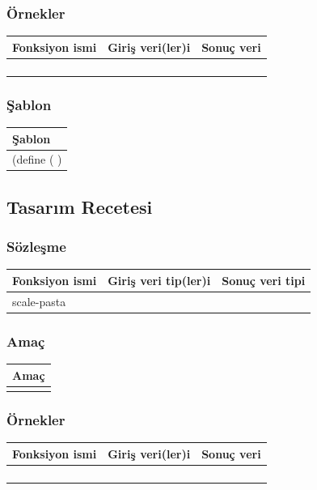 \documentclass[12pt, a4paper]{article}
\newcommand\fillin[1][3cm]{\makebox[#1]{\dotfill}}
\begin{document}
\subsubsection*{Örnekler}
\begin{tabular}{| p{4cm} | p{8cm} | p{4cm} |  }
\hline			
Fonksiyon ismi&Giriş veri(ler)i&Sonuç veri\\
\hline
& & \\[6ex]
\hline  
& & \\[6ex]
\hline  
& & \\[6ex]
\hline  
& & \\[6ex]
\hline  
\end{tabular}

\subsubsection*{Şablon}
\begin{tabular}{| p{17cm} |  }
\hline			
Şablon\\
\hline
\vspace{0,2cm}
(define (\fillin[2cm] \hspace{1cm}  \fillin[8cm] ) \\[30ex]
\hline  
\end{tabular}

\newpage
\subsection*{Tasarım Recetesi}
\subsubsection*{Sözleşme}
\begin{tabular}{| p{4cm} | p{8cm} | p{4cm} |  }
\hline			
Fonksiyon ismi&Giriş veri tip(ler)i&Sonuç veri tipi\\
\hline
scale-pasta& & \\[10ex]
\hline  
\end{tabular}

\subsubsection*{Amaç}
\begin{tabular}{| p{17cm} |  }
\hline			
Amaç\\
\hline
 \\[10ex]
\hline  
\end{tabular}

\subsubsection*{Örnekler}
\begin{tabular}{| p{4cm} | p{8cm} | p{4cm} |  }
\hline			
Fonksiyon ismi&Giriş veri(ler)i&Sonuç veri\\
\hline
& & \\[6ex]
\hline  
& & \\[6ex]
\hline  
& & \\[6ex]
\hline  
& & \\[6ex]
\hline  
\end{tabular}
\end{document}
